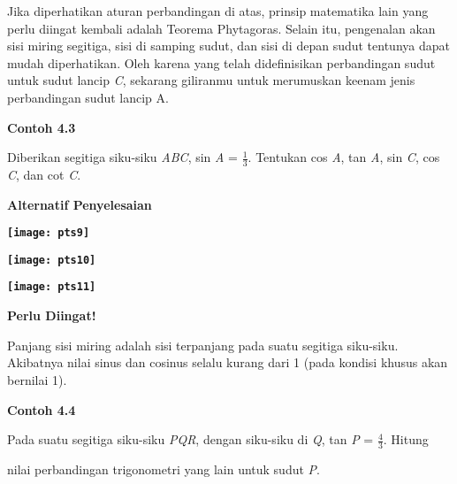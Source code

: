 \documentclass[11pt,fleqn]{book} %
\begin{document}
\noindent 

\noindent Jika diperhatikan aturan perbandingan di atas, prinsip matematika lain yang perlu diingat kembali adalah Teorema Phytagoras. Selain itu, pengenalan akan sisi miring segitiga, sisi di samping sudut, dan sisi di depan sudut tentunya dapat mudah diperhatikan. Oleh karena yang telah didefinisikan perbandingan sudut untuk sudut lancip \textit{C}, sekarang giliranmu untuk merumuskan keenam jenis perbandingan sudut lancip A.

\noindent 

\noindent 

\noindent 

\noindent 

\noindent 

\noindent \textbf{Contoh 4.3}

\noindent 

\noindent Diberikan segitiga siku-siku \textit{ABC}, sin \textit{A }= $\frac{1}{3}$. Tentukan cos \textit{A}, tan \textit{A}, sin \textit{C}, cos \textit{C}, dan cot \textit{C}.

\noindent 

\noindent \textbf{Alternatif Penyelesaian}

\noindent \textbf{}

\noindent \textbf{\texttt{[image: pts9]}}

\noindent \textbf{}

\noindent \textbf{\texttt{[image: pts10]}}

\noindent \textbf{\texttt{[image: pts11]}}

\noindent \textbf{}

\noindent \textbf{Perlu Diingat!}

\noindent \textbf{}

\noindent Panjang sisi miring adalah sisi terpanjang pada suatu segitiga siku-siku. Akibatnya nilai sinus dan cosinus selalu kurang dari 1 (pada kondisi khusus akan bernilai 1).

\noindent \textbf{}

\noindent \textbf{Contoh 4.4}

\noindent \textbf{}

\noindent Pada suatu segitiga siku-siku \textit{PQR}, dengan siku-siku di \textit{Q}, tan \textit{P }= $\frac{4}{3}$. Hitung

\noindent nilai perbandingan trigonometri yang lain untuk sudut \textit{P}. \textbf{}
\end{document}
